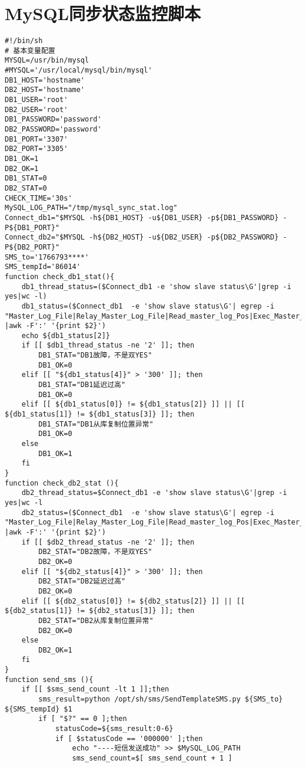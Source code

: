 \chapter{MySQL同步状态监控脚本}
\label{cha:mysqlsync}
\begin{lstlisting}[numbers=none]
#!/bin/sh
# 基本变量配置
MYSQL=/usr/bin/mysql
#MYSQL='/usr/local/mysql/bin/mysql'
DB1_HOST='hostname'
DB2_HOST='hostname'
DB1_USER='root'
DB2_USER='root'
DB1_PASSWORD='password'
DB2_PASSWORD='password'
DB1_PORT='3307'
DB2_PORT='3305'
DB1_OK=1
DB2_OK=1
DB1_STAT=0
DB2_STAT=0
CHECK_TIME='30s'
MySQL_LOG_PATH="/tmp/mysql_sync_stat.log"
Connect_db1="$MYSQL -h${DB1_HOST} -u${DB1_USER} -p${DB1_PASSWORD} -P${DB1_PORT}"
Connect_db2="$MYSQL -h${DB2_HOST} -u${DB2_USER} -p${DB2_PASSWORD} -P${DB2_PORT}"
SMS_to='1766793****'
SMS_tempId='86014'
function check_db1_stat(){
    db1_thread_status=($Connect_db1 -e 'show slave status\G'|grep -i yes|wc -l)
    db1_status=($Connect_db1  -e 'show slave status\G'| egrep -i "Master_Log_File|Relay_Master_Log_File|Read_master_log_Pos|Exec_Master_log_pos|Seconds_Behind_Master" |awk -F':' '{print $2}')
    echo ${db1_status[2]}
    if [[ $db1_thread_status -ne '2' ]]; then
        DB1_STAT="DB1故障，不是双YES"
        DB1_OK=0
    elif [[ "${db1_status[4]}" > '300' ]]; then
        DB1_STAT="DB1延迟过高"
        DB1_OK=0
    elif [[ ${db1_status[0]} != ${db1_status[2]} ]] || [[ ${db1_status[1]} != ${db1_status[3]} ]]; then
        DB1_STAT="DB1从库复制位置异常"
        DB1_OK=0
    else
        DB1_OK=1
    fi
}
function check_db2_stat (){
    db2_thread_status=$Connect_db1 -e 'show slave status\G'|grep -i yes|wc -l
    db2_status=($Connect_db1  -e 'show slave status\G'| egrep -i "Master_Log_File|Relay_Master_Log_File|Read_master_log_Pos|Exec_Master_log_pos|Seconds_Behind_Master" |awk -F':' '{print $2}')
    if [[ $db2_thread_status -ne '2' ]]; then
        DB2_STAT="DB2故障，不是双YES"
        DB2_OK=0
    elif [[ "${db2_status[4]}" > '300' ]]; then
        DB2_STAT="DB2延迟过高"
        DB2_OK=0
    elif [[ ${db2_status[0]} != ${db2_status[2]} ]] || [[ ${db2_status[1]} != ${db2_status[3]} ]]; then
        DB2_STAT="DB2从库复制位置异常"
        DB2_OK=0
    else
        DB2_OK=1
    fi
}
function send_sms (){
    if [[ $sms_send_count -lt 1 ]];then
        sms_result=python /opt/sh/sms/SendTemplateSMS.py ${SMS_to} ${SMS_tempId} $1
        if [ "$?" == 0 ];then
            statusCode=${sms_result:0-6}
            if [ $statusCode == '000000' ];then
                echo "----短信发送成功" >> $MySQL_LOG_PATH
                sms_send_count=$[ sms_send_count + 1 ]

\end{lstlisting}
